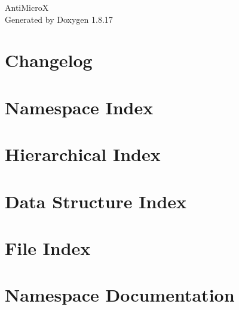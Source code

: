\let\mypdfximage\pdfximage\def\pdfximage{\immediate\mypdfximage}\documentclass[twoside]{book}
\newcommand{\+}{\discretionary{\mbox{\scriptsize$\hookleftarrow$}}{}{}}
\newcommand{\clearemptydoublepage}{%
  \newpage{\pagestyle{empty}\cleardoublepage}%
}
\begin{document}
\hypersetup{pageanchor=false,
             bookmarksnumbered=true,
             pdfencoding=unicode
            }
\begin{titlepage}
\vspace*{7cm}
\begin{center}%
{\Large Anti\+MicroX }\\
\vspace*{1cm}
{\large Generated by Doxygen 1.8.17}\\
\end{center}
\end{titlepage}
\clearemptydoublepage
{}
\tableofcontents
\clearemptydoublepage
{}
\hypersetup{pageanchor=true}

\chapter{Changelog}
\label{md__home_pawel_antimicrox_src_CHANGELOG}

\chapter{Namespace Index}

\chapter{Hierarchical Index}

\chapter{Data Structure Index}

\chapter{File Index}

\chapter{Namespace Documentation}




\end{document}
